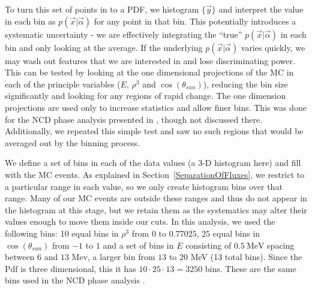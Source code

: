 To turn this set of points in to a PDF, we histogram $\{\vec{y}\}$ and
interpret the value in each bin as $p(\vec{x}|\vec{\alpha})$ for any
point in that bin.  This potentially introduces a systematic
uncertainty - we are effectively integrating the ``true''
$p(\vec{x}|\vec{\alpha})$ in each bin and only looking at the average.
If the underlying $p(\vec{x}|\vec{\alpha})$ varies quickly, we may
wash out features that we are interested in and lose discriminating
power.  This can be tested by looking at the one dimensional
projections of the MC in each of the principle variables ($E$,
$\rho^3$ and $\cos(\theta_{sun})$), reducing the bin size
significantly and looking for any regions of rapid change.  The one
dimension projections are used only to increase statistics and allow
finer bins.  This was done for the NCD phase analysis presented in
\cite{NCDPRL}, though not discussed there.  Additionally, we repeated
this simple test and saw no such regions that would be averaged out by
the binning process.

We define a set of bins in each of the data values (a 3-D histogram
here) and fill with the MC events.  As explained in \mbox{Section
\ref{SeparationOfFluxes}}, we restrict to a particular range in each
value, so we only create histogram bins over that range.  Many of our
MC events are outside these ranges and thus do not appear in the
histogram at this stage, but we retain them as the systematics may
alter their values enough to move them inside our cuts.  In this
analysis, we used the following bins: 10 equal bins in $\rho^3$ from
$0$ to $0.77025$, $25$ equal bins in $\cos(\theta_{sun})$ from $-1$ to
$1$ and a set of bins in $E$ consisting of $0.5\ \mathrm{MeV}$ spacing
between $6$ and $13$ Mev, a larger bin from $13$ to $20$ MeV (13 total
bins).  Since the Pdf is three dimensional, this it has $10\cdot 25
\cdot 13 = 3250$ bins.  These are the same bins used in the NCD phase
analysis \cite{NCDPRL}.

